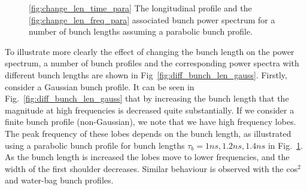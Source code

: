 \begin{figure}
\caption{\ref{fig:change_len_time_para} The longitudinal profile and the \ref{fig:change_len_freq_para} associated bunch power spectrum for a number of bunch lengths assuming a parabolic bunch profile.}
\label{fig:diff_bunch_len_para}
\end{figure}

To illustrate more clearly the effect of changing the bunch length on the power spectrum, a number of bunch profiles and the corresponding power spectra with different bunch lengths are shown in Fig~\ref{fig:diff_bunch_len_gauss}. Firstly, consider a Gaussian bunch profile. It can be seen in Fig.~\ref{fig:diff_bunch_len_gauss} that by increasing the bunch length that the magnitude at high frequencies is decreased quite substantially. If we consider a finite bunch profile (non-Gaussian), we note that we have high frequency lobes. The peak frequency of these lobes depends on the bunch length, as illustrated using a parabolic bunch profile for bunch lengths $\tau_{b} = 1ns, 1.2ns, 1.4ns$ in Fig.~\ref{fig:diff_bunch_len_para}. As the bunch length is increased the lobes move to lower frequencies, and the width of the first shoulder decreases. Similar behaviour is observed with the cos$^{2}$ and water-bag bunch profiles.


